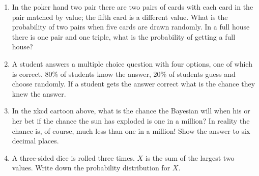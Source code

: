 \documentclass[11pt,a4paper]{scrartcl}
\begin{document}
\begin{enumerate}



\item In the poker hand two pair there are two pairs of cards with
  each card in the pair matched by value; the fifth card is a
  different value. What is the probability of two pairs when five
  cards are drawn randomly. In a full house there is one pair and one
  triple, what is the probability of getting a full house?

\item A student answers a multiple choice question with four options,
  one of which is correct. 80\% of students know the answer, 20\% of
  students guess and choose randomly. If a student gets the answer
  correct what is the chance they knew the answer.

\item In the xkcd cartoon above, what is the chance the Bayesian will
  when his or her bet if the chance the sun has exploded is one in a
  million? In reality the chance is, of course, much less than one in
  a million! Show the answer to six decimal places.

\item A three-sided dice is rolled three times. $X$ is the sum of the
  largest two values. Write down the probability distribution for $X$.

\end{enumerate}
\end{document}
